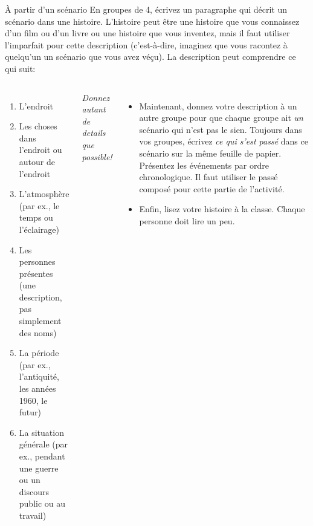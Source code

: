 \begin{frame}{À partir d'un scénario}
  \scriptsize
  En groupes de 4, écrivez un paragraphe qui décrit un scénario dans une histoire.
  L'histoire peut être une histoire que vous connaissez d'un film ou d'un livre ou une histoire que vous inventez, mais \alert{il faut utiliser l'imparfait} pour cette description (c'est-à-dire, imaginez que vous racontez à quelqu'un un scénario que vous avez véçu).
  La description peut comprendre ce qui suit:
  \begin{columns}
      \begin{enumerate}
        \item L'endroit
        \item Les choses dans l'endroit ou autour de l'endroit
        \item L'atmosphère (par ex., le temps ou l'éclairage)
        \item Les personnes présentes (une description, pas simplement des noms)
        \item La période (par ex., l'antiquité, les années 1960, le futur)
        \item La situation générale (par ex., pendant une guerre ou un discours public ou au travail)
      \end{enumerate}
      \emph{Donnez autant de details que possible!}
      \begin{itemize}
        \item<2-> Maintenant, donnez votre description à un autre groupe pour que chaque groupe ait \emph{un} scénario qui n'est pas le sien.
          Toujours dans vos groupes, écrivez \emph{ce qui s'est passé} dans ce scénario sur la même feuille de papier.
          Présentez les événements par ordre chronologique.
          \alert{Il faut utiliser le passé composé} pour cette partie de l'activité.
        \item<3-> Enfin, lisez votre histoire à la classe.
          Chaque personne doit lire un peu.
      \end{itemize}
  \end{columns}
\end{frame}
